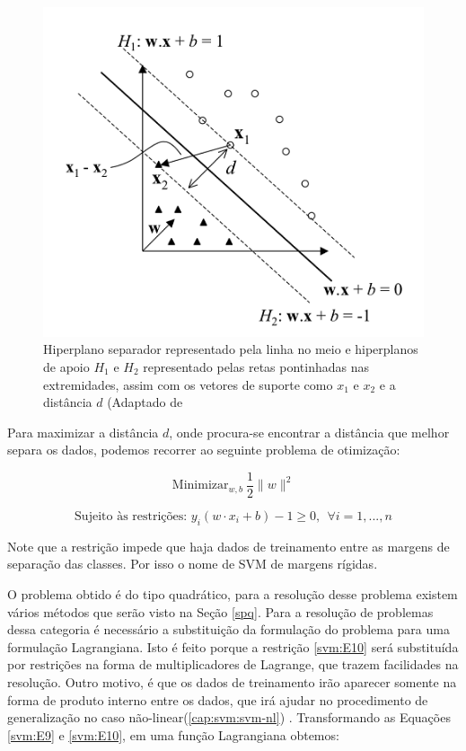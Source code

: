 \begin{figure}[htb]
	\centering
	\includegraphics[scale=0.5]{./figuras/margem_svm.png}
	\caption{Hiperplano separador representado pela linha no meio e hiperplanos de apoio $H_{1}$ e $H_{2}$ representado pelas retas pontinhadas nas extremidades, assim com os vetores de suporte como $x_{1}$ e $x_{2}$ e a distância $d$ (Adaptado de \cite{Lorena2007}}
	\label{fig:margem_svm}
\end{figure}

Para maximizar a distância $d$, onde procura-se encontrar a distância que melhor separa os dados, podemos recorrer ao seguinte problema de otimização:

\begin{equation} \label{svm:E9}
\text{Minimizar}_{w,b}\  \frac{1}{2}\parallel w \parallel^{2}
\end{equation}

\begin{equation} \label{svm:E10}
\text{Sujeito às restrições: } y_{i}(w \cdot x_{i} + b) - 1 \geq 0, \ \ \forall i=1,...,n
\end{equation}

Note que a restrição impede que haja dados de treinamento entre as margens de separação das classes. Por isso o nome de SVM de margens rígidas.

O problema obtido é do tipo quadrático, para a resolução desse problema existem vários métodos que serão visto na Seção \ref{spq}. Para a resolução de problemas dessa categoria é necessário a substituição da formulação do problema para uma formulação Lagrangiana. Isto é feito porque a restrição \ref{svm:E10} será substituída por restrições na forma de multiplicadores de Lagrange, que trazem facilidades na resolução. Outro motivo, é que os dados de treinamento irão aparecer somente na forma de produto interno entre os dados, que irá ajudar no procedimento de generalização no caso não-linear(\ref{cap:svm:svm-nl}) \cite{Burges1998Support}. Transformando as Equações \ref{svm:E9} e \ref{svm:E10}, em uma função Lagrangiana obtemos:

